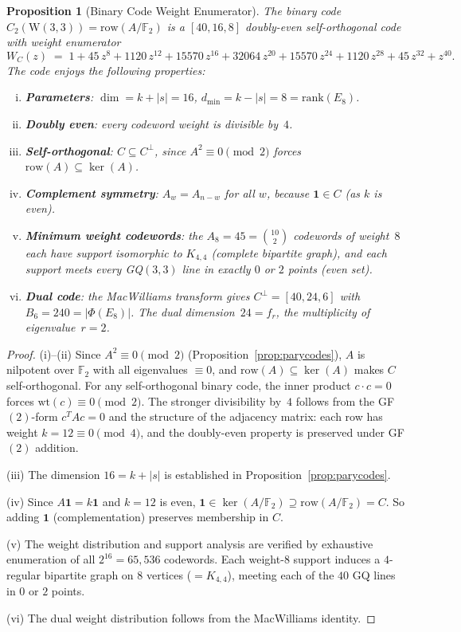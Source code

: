 \documentclass[12pt,a4paper]{article}
\newtheorem{proposition}[theorem]{Proposition}
\newcommand{\W}{\mathrm{W}(3,3)}
\begin{document}
\begin{proposition}[Binary Code Weight Enumerator]\label{prop:binarycode}
The binary code $C_2(\W) = \mathrm{row}(A / \mathbb{F}_2)$ is a
$[40, 16, 8]$ doubly-even self-orthogonal code with weight enumerator
\[
  W_C(z) \;=\; 1 + 45\,z^{8} + 1120\,z^{12} + 15570\,z^{16}
  + 32064\,z^{20} + 15570\,z^{24} + 1120\,z^{28} + 45\,z^{32}
  + z^{40}.
\]
The code enjoys the following properties:
\begin{enumerate}[(i)]
  \item \textbf{Parameters}: $\dim = k + |s| = 16$,
        $d_{\min} = k - |s| = 8 = \mathrm{rank}(E_8)$.
  \item \textbf{Doubly even}: every codeword weight is divisible by~$4$.
  \item \textbf{Self-orthogonal}: $C \subseteq C^\perp$, since
        $A^2 \equiv 0 \pmod{2}$ forces $\mathrm{row}(A) \subseteq \ker(A)$.
  \item \textbf{Complement symmetry}: $A_w = A_{n-w}$ for all $w$,
        because $\mathbf{1} \in C$ (as $k$ is even).
  \item \textbf{Minimum weight codewords}: the $A_8 = 45 = \binom{10}{2}$
        codewords of weight~$8$ each have support isomorphic to $K_{4,4}$
        (complete bipartite graph), and each support meets every GQ$(3,3)$
        line in exactly $0$ or $2$ points (\emph{even set}).
  \item \textbf{Dual code}: the MacWilliams transform gives
        $C^\perp = [40, 24, 6]$ with $B_6 = 240 = |\Phi(E_8)|$.
        The dual dimension~$24 = f_r$, the multiplicity of eigenvalue~$r = 2$.
\end{enumerate}
\end{proposition}

\begin{proof}
(i)--(ii) Since $A^2 \equiv 0 \pmod{2}$ (Proposition~\ref{prop:parycodes}),
$A$ is nilpotent over $\mathbb{F}_2$ with all eigenvalues $\equiv 0$,
and $\mathrm{row}(A) \subseteq \ker(A)$ makes $C$ self-orthogonal.
For any self-orthogonal binary code, the inner product $c \cdot c = 0$
forces $\mathrm{wt}(c) \equiv 0 \pmod{2}$.  The stronger divisibility by~$4$
follows from the GF$(2)$-form $c^T A c = 0$ and the structure of the
adjacency matrix: each row has weight $k = 12 \equiv 0 \pmod{4}$, and the
doubly-even property is preserved under GF$(2)$ addition.

(iii) The dimension $16 = k + |s|$ is established in Proposition~\ref{prop:parycodes}.

(iv) Since $A \mathbf{1} = k \mathbf{1}$ and $k = 12$ is even,
$\mathbf{1} \in \ker(A / \mathbb{F}_2) \supseteq \mathrm{row}(A / \mathbb{F}_2) = C$.
So adding $\mathbf{1}$ (complementation) preserves membership in $C$.

(v) The weight distribution and support analysis are verified by exhaustive
enumeration of all $2^{16} = 65{,}536$ codewords.  Each weight-$8$ support
induces a $4$-regular bipartite graph on $8$ vertices ($= K_{4,4}$), meeting
each of the $40$ GQ lines in $0$ or $2$ points.

(vi) The dual weight distribution follows from the MacWilliams identity.
\end{proof}
\end{document}

